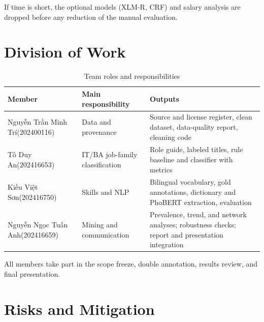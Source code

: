 \documentclass[12pt,a4paper]{article}
\newcommand{\StudentOneName}{Nguyễn Trần Minh Trí}
\newcommand{\StudentOneID}{202400116}
\newcommand{\StudentTwoName}{Tô Duy An}
\newcommand{\StudentTwoID}{202416653}
\newcommand{\StudentThreeName}{Kiều Việt Sơn}
\newcommand{\StudentThreeID}{202416750}
\newcommand{\StudentFourName}{Nguyễn Ngọc Tuấn Anh}
\newcommand{\StudentFourID}{202416659}
\begin{document}
If time is short, the optional models (XLM-R, CRF) and salary analysis are
dropped before any reduction of the manual evaluation.

\section{Division of Work}

\begin{table}[H]
\centering\small
\caption{Team roles and responsibilities}
\label{tab:team}
\begin{tabularx}{\textwidth}{@{}P{3.6cm} P{3.4cm} L@{}}
\toprule
\textbf{Member} & \textbf{Main responsibility} & \textbf{Outputs} \\
\midrule
\StudentOneName\newline(\StudentOneID) & Data and provenance & Source and
  license register, clean dataset, data-quality report, cleaning code \\
\addlinespace
\StudentTwoName\newline(\StudentTwoID) & IT/BA job-family classification &
  Role guide, labeled titles, rule baseline and classifier with metrics \\
\addlinespace
\StudentThreeName\newline(\StudentThreeID) & Skills and NLP & Bilingual
  vocabulary, gold annotations, dictionary and PhoBERT extraction,
  evaluation \\
\addlinespace
\StudentFourName\newline(\StudentFourID) & Mining and communication &
  Prevalence, trend, and network analyses; robustness checks; report and
  presentation integration \\
\bottomrule
\end{tabularx}
\end{table}

All members take part in the scope freeze, double annotation, results review,
and final presentation.

\section{Risks and Mitigation}
\end{document}
